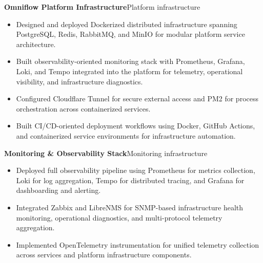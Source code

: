 
\textbf{Omniflow Platform Infrastructure}\hfill {\color{SecondaryText}\small Platform infrastructure}\par
\begin{itemize}
  \item Designed and deployed Dockerized distributed infrastructure spanning PostgreSQL, Redis, RabbitMQ, and MinIO for modular platform service architecture.
  \item Built observability-oriented monitoring stack with Prometheus, Grafana, Loki, and Tempo integrated into the platform for telemetry, operational visibility, and infrastructure diagnostics.
  \item Configured Cloudflare Tunnel for secure external access and PM2 for process orchestration across containerized services.
  \item Built CI/CD-oriented deployment workflows using Docker, GitHub Actions, and containerized service environments for infrastructure automation.
\end{itemize}

\newpage
\textbf{Monitoring \& Observability Stack}\hfill {\color{SecondaryText}\small Monitoring infrastructure}\par
\begin{itemize}
  \item Deployed full observability pipeline using Prometheus for metrics collection, Loki for log aggregation, Tempo for distributed tracing, and Grafana for dashboarding and alerting.
  \item Integrated Zabbix and LibreNMS for SNMP-based infrastructure health monitoring, operational diagnostics, and multi-protocol telemetry aggregation.
  \item Implemented OpenTelemetry instrumentation for unified telemetry collection across services and platform infrastructure components.
\end{itemize}

